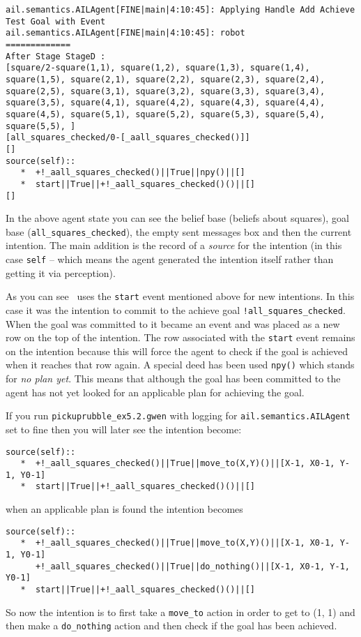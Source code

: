 \begin{verbatim}
ail.semantics.AILAgent[FINE|main|4:10:45]: Applying Handle Add Achieve Test Goal with Event 
ail.semantics.AILAgent[FINE|main|4:10:45]: robot
=============
After Stage StageD :
[square/2-square(1,1), square(1,2), square(1,3), square(1,4), square(1,5), square(2,1), square(2,2), square(2,3), square(2,4), square(2,5), square(3,1), square(3,2), square(3,3), square(3,4), square(3,5), square(4,1), square(4,2), square(4,3), square(4,4), square(4,5), square(5,1), square(5,2), square(5,3), square(5,4), square(5,5), ]
[all_squares_checked/0-[_aall_squares_checked()]]
[]
source(self):: 
   *  +!_aall_squares_checked()||True||npy()||[]
   *  start||True||+!_aall_squares_checked()()||[]
[] 
\end{verbatim}
In the above agent state you can see the belief base (beliefs about squares), goal base (\texttt{all\_squares\_checked}), the empty sent messages box and then the current intention.  The main addition is the record of a \emph{source} for the intention (in this case \texttt{self} -- which means the agent generated the intention itself rather than getting it via perception).

As you can see \gwendolen\ uses the \texttt{start} event mentioned above for new intentions.  In this case it was the intention to commit to the achieve goal \lstinline{!all_squares_checked}.  When the goal was committed to it became an event and was placed as a new row on the top of the intention.  The row associated with the \texttt{start} event remains on the intention because this will force the agent to check if the goal is achieved when it reaches that row again.  A special deed has been used \texttt{npy()} which stands for \emph{no plan yet}.  This means that although the goal has been committed to the agent has not yet looked for an applicable plan for achieving the goal.

If you run \texttt{pickuprubble\_ex5.2.gwen} with logging for \texttt{ail.semantics.AILAgent} set to fine then you will later see the intention become:
\begin{verbatim}
source(self):: 
   *  +!_aall_squares_checked()||True||move_to(X,Y)()||[X-1, X0-1, Y-1, Y0-1]
   *  start||True||+!_aall_squares_checked()()||[]
\end{verbatim}
when an applicable plan is found the intention becomes

\begin{verbatim}
source(self):: 
   *  +!_aall_squares_checked()||True||move_to(X,Y)()||[X-1, X0-1, Y-1, Y0-1]
      +!_aall_squares_checked()||True||do_nothing()||[X-1, X0-1, Y-1, Y0-1]
   *  start||True||+!_aall_squares_checked()()||[]
\end{verbatim}
So now the intention is to first take a \texttt{move\_to} action in order to get to (1, 1) and then make a \texttt{do\_nothing} action and then check if the goal has been achieved.

